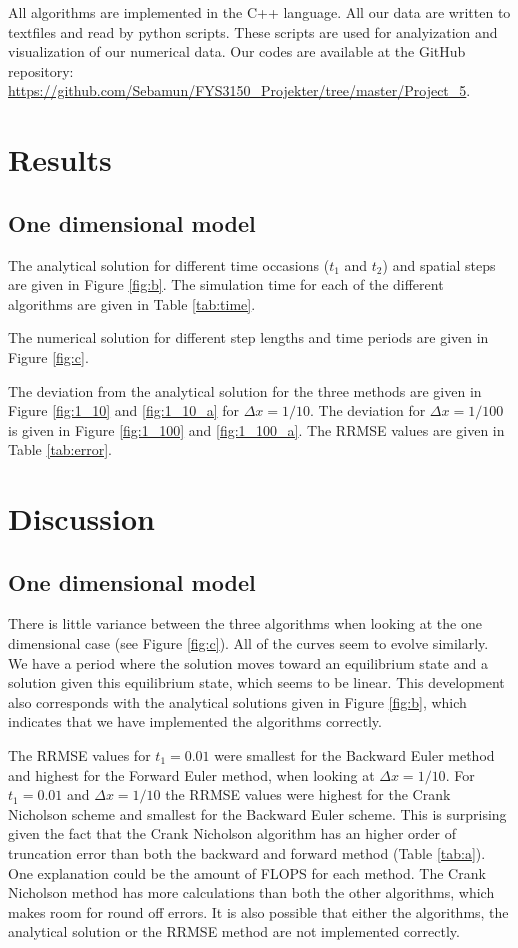 \documentclass{article}
\begin{document}
\begin{multicols}{2}
All algorithms are implemented in the C++ language. All our data are written to textfiles and read by python scripts. These scripts are used for analyization and visualization of our numerical data. Our codes are available at the GitHub repository: \url{https://github.com/Sebamun/FYS3150_Projekter/tree/master/Project_5}.

\section{Results}

\subsection{One dimensional model}

The analytical solution for different time occasions ($t_1$ and $t_2$) and spatial steps are given in Figure \ref{fig:b}. The simulation time for each of the different algorithms are given in Table \ref{tab:time}.

The numerical solution for different step lengths and time periods are given in Figure \ref{fig:c}.

The deviation from the analytical solution for the three methods are given in Figure \ref{fig:1_10} and \ref{fig:1_10_a} for $\Delta x = 1/10$. The deviation for $\Delta x = 1/100$ is given in Figure \ref{fig:1_100} and \ref{fig:1_100_a}. The RRMSE values are given in Table \ref{tab:error}.

\section{Discussion}

\subsection{One dimensional model}

There is little variance between the three algorithms when looking at the one dimensional case (see Figure \ref{fig:c}). All of the curves seem to evolve similarly. We have a period where the solution moves toward an equilibrium state and a solution given this equilibrium state, which seems to be linear. This development also corresponds with the analytical solutions given in Figure \ref{fig:b}, which indicates that we have implemented the algorithms correctly. 

The RRMSE values for $t_1=0.01$ were smallest for the Backward Euler method and highest for the Forward Euler method, when looking at $\Delta x = 1/10$. For $t_1=0.01$ and $\Delta x = 1/10$ the RRMSE values were highest for the Crank Nicholson scheme and smallest for the Backward Euler scheme. This is surprising given the fact that the Crank Nicholson algorithm has an higher order of truncation error than both the backward and forward method (Table \ref{tab:a}). One explanation could be the amount of FLOPS for each method. The Crank Nicholson method has more calculations than both the other algorithms, which makes room for round off errors. It is also possible that either the algorithms, the analytical solution or the RRMSE method are not implemented correctly. 


\end{multicols}
\end{document}
